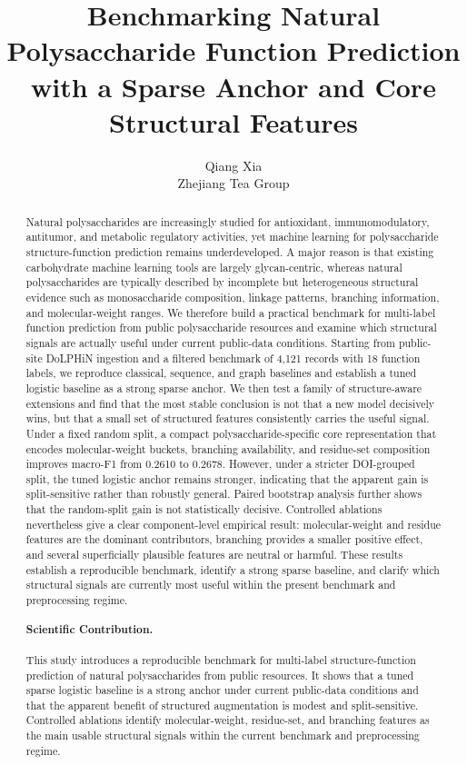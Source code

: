 \documentclass{article}
\title{Benchmarking Natural Polysaccharide Function Prediction with a Sparse Anchor and Core Structural Features}
\author{Qiang Xia\\Zhejiang Tea Group}
\date{}
\begin{document}
\maketitle
\doublespacing
\linenumbers

\begin{abstract}
Natural polysaccharides are increasingly studied for antioxidant, immunomodulatory, antitumor, and metabolic regulatory activities, yet machine learning for polysaccharide structure-function prediction remains underdeveloped. A major reason is that existing carbohydrate machine learning tools are largely glycan-centric, whereas natural polysaccharides are typically described by incomplete but heterogeneous structural evidence such as monosaccharide composition, linkage patterns, branching information, and molecular-weight ranges. We therefore build a practical benchmark for multi-label function prediction from public polysaccharide resources and examine which structural signals are actually useful under current public-data conditions. Starting from public-site DoLPHiN ingestion and a filtered benchmark of 4,121 records with 18 function labels, we reproduce classical, sequence, and graph baselines and establish a tuned logistic baseline as a strong sparse anchor. We then test a family of structure-aware extensions and find that the most stable conclusion is not that a new model decisively wins, but that a small set of structured features consistently carries the useful signal. Under a fixed random split, a compact polysaccharide-specific core representation that encodes molecular-weight buckets, branching availability, and residue-set composition improves macro-F1 from 0.2610 to 0.2678. However, under a stricter DOI-grouped split, the tuned logistic anchor remains stronger, indicating that the apparent gain is split-sensitive rather than robustly general. Paired bootstrap analysis further shows that the random-split gain is not statistically decisive. Controlled ablations nevertheless give a clear component-level empirical result: molecular-weight and residue features are the dominant contributors, branching provides a smaller positive effect, and several superficially plausible features are neutral or harmful. These results establish a reproducible benchmark, identify a strong sparse baseline, and clarify which structural signals are currently most useful within the present benchmark and preprocessing regime.

\paragraph{Scientific Contribution.}
This study introduces a reproducible benchmark for multi-label structure-function prediction of natural polysaccharides from public resources. It shows that a tuned sparse logistic baseline is a strong anchor under current public-data conditions and that the apparent benefit of structured augmentation is modest and split-sensitive. Controlled ablations identify molecular-weight, residue-set, and branching features as the main usable structural signals within the current benchmark and preprocessing regime.
\end{abstract}
\end{document}
